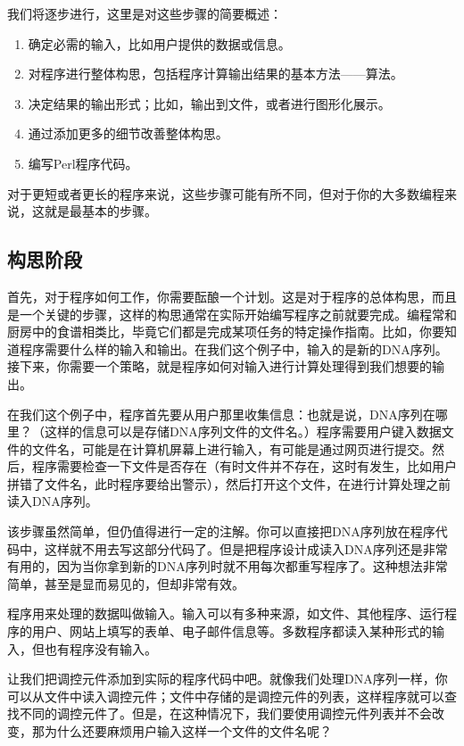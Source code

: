 我们将逐步进行，这里是对这些步骤的简要概述：

\begin{enumerate}
  \item 确定必需的输入，比如用户提供的数据或信息。
  \item 对程序进行整体构思，包括程序计算输出结果的基本方法——算法。
  \item 决定结果的输出形式；比如，输出到文件，或者进行图形化展示。
  \item 通过添加更多的细节改善整体构思。
  \item 编写Perl程序代码。
\end{enumerate}

对于更短或者更长的程序来说，这些步骤可能有所不同，但对于你的大多数编程来说，这就是最基本的步骤。

\subsection{构思阶段}
首先，对于程序如何工作，你需要酝酿一个计划。这是对于程序的总体构思，而且是一个关键的步骤，这样的构思通常在实际开始编写程序之前就要完成。编程常和厨房中的食谱相类比，毕竟它们都是完成某项任务的特定操作指南。比如，你要知道程序需要什么样的输入和输出。在我们这个例子中，输入的是新的DNA序列。接下来，你需要一个策略，就是程序如何对输入进行计算处理得到我们想要的输出。

在我们这个例子中，程序首先要从用户那里收集信息：也就是说，DNA序列在哪里？（这样的信息可以是存储DNA序列文件的文件名。）程序需要用户键入数据文件的文件名，可能是在计算机屏幕上进行输入，有可能是通过网页进行提交。然后，程序需要检查一下文件是否存在（有时文件并不存在，这时有发生，比如用户拼错了文件名，此时程序要给出警示），然后打开这个文件，在进行计算处理之前读入DNA序列。

该步骤虽然简单，但仍值得进行一定的注解。你可以直接把DNA序列放在程序代码中，这样就不用去写这部分代码了。但是把程序设计成读入DNA序列还是非常有用的，因为当你拿到新的DNA序列时就不用每次都重写程序了。这种想法非常简单，甚至是显而易见的，但却非常有效。

程序用来处理的数据叫做输入。输入可以有多种来源，如文件、其他程序、运行程序的用户、网站上填写的表单、电子邮件信息等。多数程序都读入某种形式的输入，但也有程序没有输入。

让我们把调控元件添加到实际的程序代码中吧。就像我们处理DNA序列一样，你可以从文件中读入调控元件；文件中存储的是调控元件的列表，这样程序就可以查找不同的调控元件了。但是，在这种情况下，我们要使用调控元件列表并不会改变，那为什么还要麻烦用户输入这样一个文件的文件名呢？

